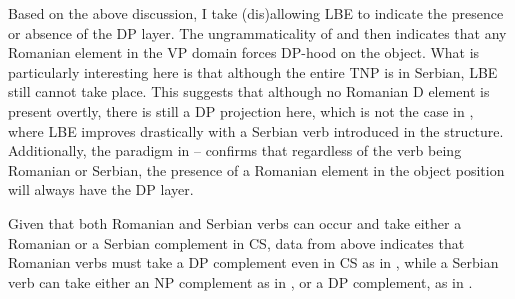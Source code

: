 \documentclass[output=paper,hidelinks,newtxmath,]{langscibook}
\begin{document}
\ea \label{15:ex18}
	\z
\z

\ea \label{15:ex19}
	\z
\z

\noindent Based on the above discussion, I take (dis)allowing LBE to indicate the presence or absence of the DP layer. The ungrammaticality of  and  then indicates that any Romanian element in the VP domain forces DP-hood on the object. What is particularly interesting here is that although the entire TNP is in Serbian, LBE still cannot take place. This suggests that although no Romanian D element is present overtly, there is still a DP projection here, which is not the case in , where LBE improves drastically with a Serbian verb introduced in the structure. Additionally, the paradigm in -- confirms that regardless of the verb being Romanian or Serbian, the presence of a Romanian element in the object position will always have the DP layer.

Given that both Romanian and Serbian verbs can occur and take either a Romanian or a Serbian complement in CS, data from above indicates that Romanian verbs must take a DP complement even in CS as in , while a Serbian verb can take either an NP complement as in , or a DP complement, as in .
\end{document}
